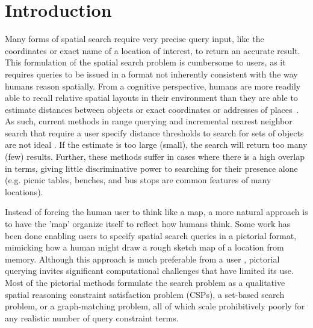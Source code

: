 \section{Introduction}
\label{section:introduction}
\par{Many forms of spatial search require very precise query input, like the coordinates or exact name of a location of interest, to return an accurate result. 
This formulation of the spatial search problem is cumbersome to users, as it requires queries to be issued in a format not inherently consistent with the way humans reason spatially.
From a cognitive perspective, humans are more readily able to recall relative spatial layouts in their environment than they are able to estimate distances between objects or exact coordinates or addresses of places~\cite{Schwering2014, Weisberg2016, Miller2013, Keatley2021}.
As such, current methods in range querying and incremental nearest neighbor search that require a user specify distance thresholds to search for sets of objects are not ideal .
If the estimate is too large (small), the search will return too many (few) results. 
Further, these methods suffer in cases where there is a high overlap in terms, giving little discriminative power to searching for their presence alone (e.g. picnic tables, benches, and bus stops are common features of many locations). 
}
%
\par{Instead of forcing the human user to think like a map, a more natural approach is to have the 'map' organize itself to reflect how humans think. 
Some work has been done enabling users to specify spatial search queries in a pictorial format, mimicking how a human might draw a rough sketch map of a location from memory.
Although this approach is much preferable from a user , pictorial querying invites significant computational challenges that have limited its use. 
Most of the pictorial methods formulate the search problem
as a qualitative spatial reasoning constraint satisfaction problem
(CSPs), a set-based search problem, or a graph-matching problem, all of which scale prohibitively poorly for any realistic number of query constraint terms.
}

